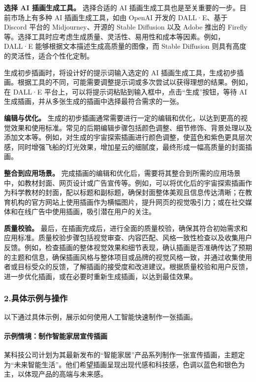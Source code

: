 \textbf{选择 AI 插画生成工具。} 选择合适的 AI 插画生成工具也是至关重要的一步。目前市场上有多种 AI 插画生成工具，如由 OpenAI 开发的 DALL·E、基于 Discord 平台的 Midjourney、开源的 Stable Diffusion 以及 Adobe 推出的 Firefly 等。选择工具时应考虑生成质量、灵活性、易用性和成本等因素。例如，DALL·E 能够根据文本描述生成高质量的图像，而 Stable Diffusion 则具有高度的灵活性，适合个性化定制。

生成初步插画时，将设计好的提示词输入选定的 AI 插画生成工具，生成初步插画。根据工具的不同，可能需要调整提示词或多次尝试以获得理想的结果。例如，在 DALL·E 平台上，可以将提示词粘贴到输入框中，点击“生成”按钮，等待 AI 生成插画，并从多张生成的插画中选择最符合需求的一张。

\textbf{编辑与优化。} 生成的初步插画通常需要进行一定的编辑和优化，以达到更高的视觉效果和使用标准。常见的后期编辑步骤包括颜色调整、细节修饰、背景处理以及添加文本等。例如，对生成的宇宙探索插画进行颜色调整，使蓝色和紫色更具层次感，同时增强飞船的灯光效果，增加星云的细腻度，最终形成一幅高质量的封面插画。

\textbf{整合到应用场景。} 完成插画的编辑和优化后，需要将其整合到所需的应用场景中，如教材封面、网页设计或广告宣传等。例如，可以将优化后的宇宙探索插画作为科学教材的封面，配以标题和副标题，确保封面整体美观且信息传达清晰；在教育机构的官方网站上使用插画作为横幅图片，提升网页的视觉吸引力；或在社交媒体和在线广告中使用插画，吸引潜在用户的关注。

\textbf{质量校验。} 最后，在插画完成后，进行全面的质量校验，确保其符合初始需求和应用标准。质量校验步骤包括视觉审查、内容匹配、风格一致性检查以及收集用户反馈。例如，检查插画的整体视觉效果和细节表现，确认插画是否准确传达了预期的主题和信息，确保插画风格与整体项目或品牌的视觉风格一致，并通过收集使用者或目标受众的反馈，了解插画的接受度和改进建议。根据质量校验和用户反馈，进一步优化插画，或在必要时重新生成插画，以达到最佳效果。

\subsubsection{2.具体示例与操作}

以下通过具体示例，展示如何使用人工智能快速制作一张插画。

\paragraph{示例情境：制作智能家居宣传插画}

某科技公司计划为其最新发布的“智能家居”产品系列制作一张宣传插画，主题定为“未来智能生活”。他们希望插画呈现出现代感和科技感，色调以蓝色和银色为主，以体现产品的高端与未来感。

